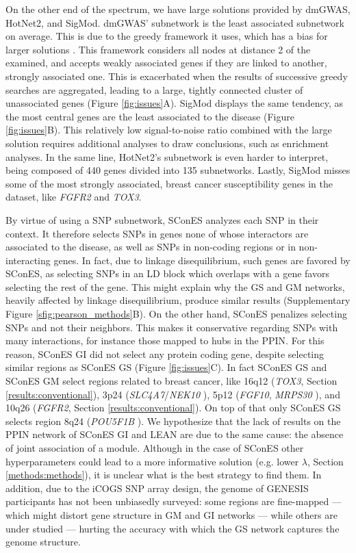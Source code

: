 \documentclass[twocolumn, 11pt, draft]{article}
\begin{document}
On the other end of the spectrum, we have large solutions provided by dmGWAS, HotNet2, and SigMod. dmGWAS' subnetwork is the least associated subnetwork on average. This is due to the greedy framework it uses, which has a bias for larger solutions \cite{nikolayeva_network_2018}. This framework considers all nodes at distance 2 of the examined, and accepts weakly associated genes if they are linked to another, strongly associated one. This is exacerbated when the results of successive greedy searches are aggregated, leading to a large, tightly connected cluster of unassociated genes (Figure \ref{fig:issues}A). SigMod displays the same tendency, as the most central genes are the least associated to the disease (Figure \ref{fig:issues}B). This relatively low signal-to-noise ratio combined with the large solution requires additional analyses to draw conclusions, such as enrichment analyses. In the same line, HotNet2's subnetwork is even harder to interpret, being composed of 440 genes divided into 135 subnetworks. Lastly, SigMod misses some of the most strongly associated, breast cancer susceptibility genes in the dataset, like \emph{FGFR2} and \emph{TOX3}.

By virtue of using a SNP subnetwork, SConES analyzes each SNP in their context. It therefore selects SNPs in genes none of whose interactors are associated to the disease, as well as SNPs in non-coding regions or in non-interacting genes. In fact, due to linkage disequilibrium, such genes are favored by SConES, as selecting SNPs in an LD block which overlaps with a gene favors selecting the rest of the gene. This might explain why the GS and GM networks, heavily affected by linkage disequilibrium, produce similar results (Supplementary Figure \ref{sfig:pearson_methods}B). On the other hand, SConES penalizes selecting SNPs and not their neighbors. This makes it conservative regarding SNPs with many interactions, for instance those mapped to hubs in the PPIN. For this reason, SConES GI did not select any protein coding gene, despite selecting similar regions as SConES GS (Figure \ref{fig:issues}C). In fact SConES GS and SConES GM select regions related to breast cancer, like 16q12 (\emph{TOX3}, Section \ref{results:conventional}), 3p24 (\emph{SLC4A7}/\emph{NEK10} \cite{ahmed_newly_2009}), 5p12 (\emph{FGF10}, \emph{MRPS30} \cite{quigley_5p12_2014}), and 10q26 (\emph{FGFR2}, Section \ref{results:conventional}). On top of that only SConES GS selects region 8q24 (\emph{POU5F1B} \cite{breyer_expressed_2014}). We hypothesize that the lack of results on the PPIN network of SConES GI and LEAN are due to the same cause: the absence of joint association of a module. Although in the case of SConES other hyperparameters could lead to a more informative solution (e.g. lower \(\lambda\), Section \ref{methods:methods}), it is unclear what is the best strategy to find them. In addition, due to the iCOGS SNP array design, the genome of GENESIS participants has not been unbiasedly surveyed: some regions are fine-mapped --- which might distort gene structure in GM and GI networks --- while others are under studied --- hurting the accuracy with which the GS network captures the genome structure.
\end{document}
